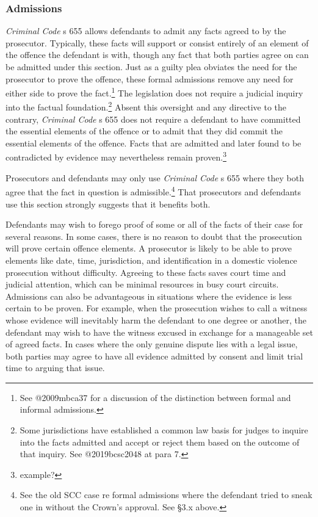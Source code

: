 \subsubsection{Admissions}

\textit{Criminal Code} s 655 allows defendants to admit any facts agreed to by the prosecutor. Typically, these facts will support or consist entirely of an element of the offence the defendant is with, though any fact that both parties agree on can be admitted under this section. Just as a guilty plea obviates the need for the prosecutor to prove the offence, these formal admissions remove any need for either side to prove the fact.\footnote{See @2009mbca37 for a discussion of the distinction between formal and informal admissions.} The legislation does not require a judicial inquiry into the factual foundation.\footnote{Some jurisdictions have established a common law basis for judges to inquire into the facts admitted and accept or reject them based on the outcome of that inquiry. See @2019bcsc2048 at para 7.} Absent this oversight and any directive to the contrary, \textit{Criminal Code} s 655 does not require a defendant to have committed the essential elements of the offence or to admit that they did commit the essential elements of the offence. Facts that are admitted and later found to be contradicted by evidence may nevertheless remain proven.\footnote{example?}

Prosecutors and defendants may only use \textit{Criminal Code} s 655 where they both agree that the fact in question is admissible.\footnote{See the old SCC case re formal admissions where the defendant tried to sneak one in without the Crown's approval. See §3.x above.} That prosecutors and defendants use this section strongly suggests that it benefits both.

Defendants may wish to forego proof of some or all of the facts of their case for several reasons. In some cases, there is no reason to doubt that the prosecution will prove certain offence elements. A prosecutor is likely to be able to prove elements like date, time, jurisdiction, and identification in a domestic violence prosecution without difficulty. Agreeing to these facts saves court time and judicial attention, which can be minimal resources in busy court circuits. Admissions can also be advantageous in situations where the evidence is less certain to be proven. For example, when the prosecution wishes to call a witness whose evidence will inevitably harm the defendant to one degree or another, the defendant may wish to have the witness excused in exchange for a manageable set of agreed facts. In cases where the only genuine dispute lies with a legal issue, both parties may agree to have all evidence admitted by consent and limit trial time to arguing that issue. 

